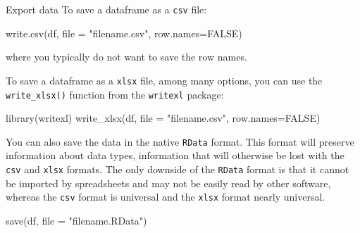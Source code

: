 \documentclass[
  11pt,
  ignorenonframetext,
  svgnames, handout, t]{beamer}
\newenvironment{Shaded}{\begin{snugshade}}{\end{snugshade}}
\newcommand{\AttributeTok}[1]{\textcolor[rgb]{0.77,0.63,0.00}{#1}}
\newcommand{\ConstantTok}[1]{\textcolor[rgb]{0.00,0.00,0.00}{#1}}
\newcommand{\FunctionTok}[1]{\textcolor[rgb]{0.00,0.00,0.00}{#1}}
\newcommand{\NormalTok}[1]{#1}
\newcommand{\StringTok}[1]{\textcolor[rgb]{0.31,0.60,0.02}{#1}}
\begin{document}
\begin{frame}[fragile]{Export data}
\protect\hypertarget{export-data}{}
To save a dataframe as a \texttt{csv} file:

\footnotesize

\begin{Shaded}
\begin{Highlighting}[]
\FunctionTok{write.csv}\NormalTok{(df, }\AttributeTok{file =} \StringTok{"filename.csv"}\NormalTok{, }\AttributeTok{row.names=}\ConstantTok{FALSE}\NormalTok{)}
\end{Highlighting}
\end{Shaded}

\normalsize where you typically do not want to save the row names.

To save a dataframe as a \texttt{xlsx} file, among many options, you can
use the \texttt{write\_xlsx()} function from the \texttt{writexl}
package:

\footnotesize

\begin{Shaded}
\begin{Highlighting}[]
\FunctionTok{library}\NormalTok{(writexl)}
\FunctionTok{write\_xlsx}\NormalTok{(df, }\AttributeTok{file =} \StringTok{"filename.csv"}\NormalTok{, }\AttributeTok{row.names=}\ConstantTok{FALSE}\NormalTok{)}
\end{Highlighting}
\end{Shaded}

\normalsize

You can also save the data in the native \texttt{RData} format. This
format will preserve information about data types, information that will
otherwise be lost with the \texttt{csv} and \texttt{xlsx} formats. The
only downside of the \texttt{RData} format is that it cannot be imported
by spreadsheets and may not be easily read by other software, whereas
the \texttt{csv} format is universal and the \texttt{xlsx} format nearly
universal.

\footnotesize

\begin{Shaded}
\begin{Highlighting}[]
\FunctionTok{save}\NormalTok{(df, }\AttributeTok{file =} \StringTok{"filename.RData"}\NormalTok{)}
\end{Highlighting}
\end{Shaded}

\normalsize
\end{frame}
\end{document}
